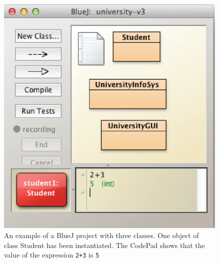 





\begin {figure}

\includegraphics {figs/ch1/project.eps}


\caption {An example of a BlueJ project with three classes. One
object of class Student has been instantiated. The CodePad shows
that the value of the expression \texttt{2+3} is 
\texttt{5}}

\label {fig:project}

\end {figure}


